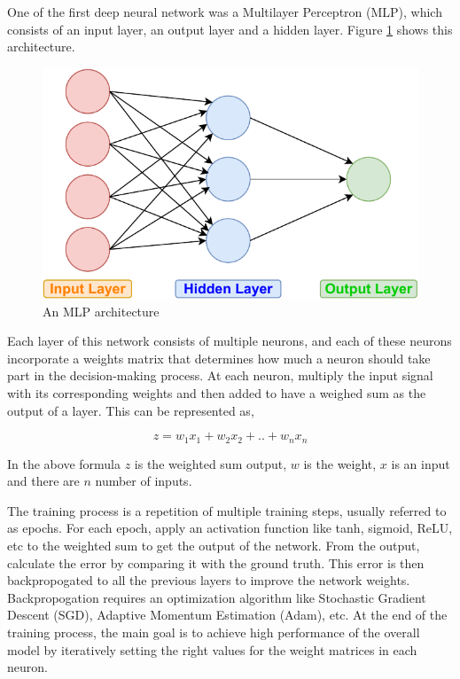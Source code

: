 One of the first deep neural network was a Multilayer Perceptron (MLP), which consists of an input layer, an output layer and a hidden layer. Figure \ref{fig:mlp} shows this architecture. 

\begin{figure}[ht]
  \begin{center}
    \includegraphics[width=\textwidth]{images/MLP.pdf} 
    \caption{An MLP architecture}
    \label{fig:mlp}
  \end{center}
\end{figure}

Each layer of this network consists of multiple neurons, and each of these neurons incorporate a weights matrix that determines how much a neuron should take part in the decision-making process. At each neuron, multiply the input signal with its corresponding weights and then added to have a weighed sum as the output of a layer. This can be represented as,

\[ z = w_1x_1 + w_2x_2 + .. + w_nx_n \]

In the above formula $z$ is the weighted sum output, $w$ is the weight, $x$ is an input and there are $n$ number of inputs. 

The training process is a repetition of multiple training steps, usually referred to as epochs. For each epoch, apply an activation function like tanh, sigmoid, ReLU, etc to the weighted sum to get the output of the network. From the output, calculate the error by comparing it with the ground truth. This error is then backpropogated to all the previous layers to improve the network weights. Backpropogation requires an optimization algorithm like Stochastic Gradient Descent (SGD), Adaptive Momentum Estimation (Adam), etc. At the end of the training process, the main goal is to achieve high performance of the overall model by iteratively setting the right values for the weight matrices in each neuron.

